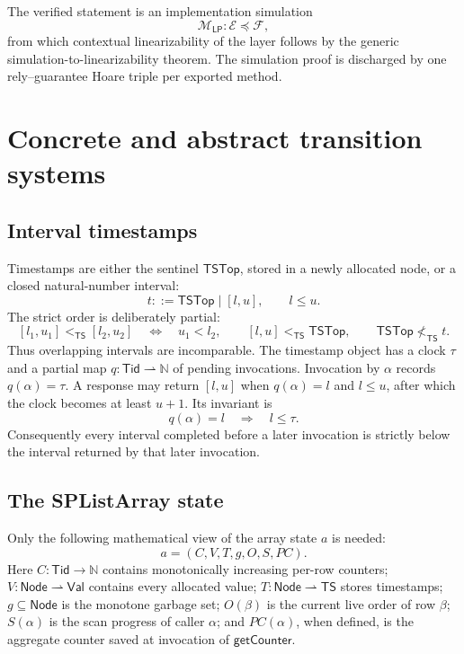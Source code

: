 \documentclass[11pt]{article}
\theoremstyle{definition}
\theoremstyle{remark}
\newcommand{\Tid}{\mathsf{Tid}}
\newcommand{\Val}{\mathsf{Val}}
\newcommand{\Node}{\mathsf{Node}}
\newcommand{\TS}{\mathsf{TS}}
\newcommand{\topts}{\mathsf{TSTop}}
\newcommand{\interval}[2]{[#1,#2]}
\begin{document}
The verified statement is an implementation simulation
\[
  \mathcal M_{\mathsf{LP}}:\mathcal E\preccurlyeq\mathcal F,
\]
from which contextual linearizability of the layer follows by the generic
simulation-to-linearizability theorem.  The simulation proof is discharged by
one rely--guarantee Hoare triple per exported method.

\section{Concrete and abstract transition systems}

\subsection{Interval timestamps}

Timestamps are either the sentinel \(\topts\), stored in a newly allocated
node, or a closed natural-number interval:
\[
  t ::= \topts \mid \interval{l}{u}, \qquad l\le u.
\]
The strict order is deliberately partial:
\[
\interval{l_1}{u_1}<_{\TS}\interval{l_2}{u_2}
  \quad\Longleftrightarrow\quad u_1<l_2,
  \qquad
\interval{l}{u}<_{\TS}\topts,
  \qquad
\topts\not<_{\TS}t.
\]
Thus overlapping intervals are incomparable.  The timestamp object has a
clock \(\tau\) and a partial map \(q:\Tid\rightharpoonup\mathbb N\) of pending
invocations.  Invocation by \(\alpha\) records \(q(\alpha)=\tau\).  A response
may return \(\interval{l}{u}\) when \(q(\alpha)=l\) and \(l\le u\), after which
the clock becomes at least \(u+1\).  Its invariant is
\[
  q(\alpha)=l \quad\Longrightarrow\quad l\le\tau.
\]
Consequently every interval completed before a later invocation is strictly
below the interval returned by that later invocation.

\subsection{The SPListArray state}

Only the following mathematical view of the array state \(a\) is needed:
\[
  a=(C,V,T,g,O,S,PC).
\]
Here \(C:\Tid\to\mathbb N\) contains monotonically increasing per-row
counters; \(V:\Node\rightharpoonup\Val\) contains every allocated value;
\(T:\Node\rightharpoonup\TS\) stores timestamps; \(g\subseteq\Node\) is the
monotone garbage set; \(O(\beta)\) is the current live order of row \(\beta\);
\(S(\alpha)\) is the scan progress of caller \(\alpha\); and
\(PC(\alpha)\), when defined, is the aggregate counter saved at invocation of
\(\mathsf{getCounter}\).
\end{document}
